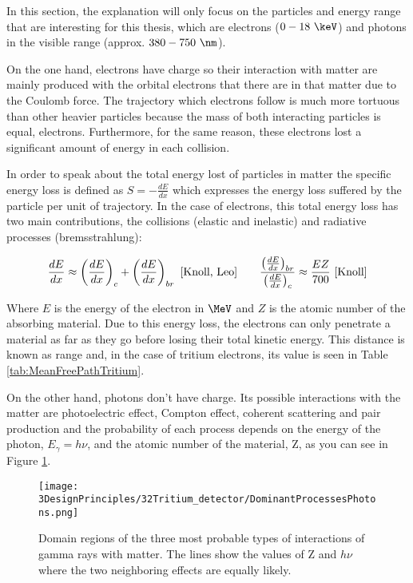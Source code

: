 In this section, the explanation will only focus on the particles and energy range that are interesting for this thesis, which are electrons ($0-18~\keV$) and photons in the visible range (approx. $380-750~\nm$).

On the one hand, electrons have charge so their interaction with matter are mainly produced with the orbital electrons that there are in that matter due to the Coulomb force. The trajectory which electrons follow is much more tortuous than other heavier particles because the mass of both interacting particles is equal, electrons. Furthermore, for the same reason, these electrons lost a significant amount of energy in each collision.

In order to speak about the total energy lost of particles in matter the specific energy loss is defined as $S=-\frac{dE}{dx}$ which expresses the energy loss suffered by the particle per unit of trajectory. In the case of electrons, this total energy loss has two main contributions, the collisions (elastic and inelastic) and radiative processes (bremsstrahlung):

\begin{equation}
\frac{dE}{dx} \approx \left(\frac{dE}{dx}\right)_{c} + \left(\frac{dE}{dx}\right)_{br} ~\cite{Knoll, Leo} \qquad  \frac{\left(\frac{dE}{dx}\right)_{br}}{\left(\frac{dE}{dx}\right)_{c}} \approx \frac{EZ}{700} ~\cite{Knoll}
\label{eq:ElectronInteraction}
\end{equation}

Where $E$ is the energy of the electron in $\MeV$ and $Z$ is the atomic number of the absorbing material. Due to this energy loss, the electrons can only penetrate a material as far as they go before losing their total kinetic energy. This distance is known as range and, in the case of tritium electrons, its value is seen in Table \ref{tab:MeanFreePathTritium}.

On the other hand, photons don't have charge. Its possible interactions with the matter are photoelectric effect, Compton effect, coherent scattering and pair production and the probability of each process depends on the energy of the photon, $E_\gamma = h\nu$, and the atomic number of the material, Z, as you can see in Figure \ref{fig:ProcessesPhotons}.

\begin{figure}[htbp]
\centering
\texttt{[image: 3DesignPrinciples/32Tritium\_detector/DominantProcessesPhotons.png]}
\caption{Domain regions of the three most probable types of interactions of gamma rays with matter. The lines show the values of Z and $h\nu$ where the two neighboring effects are equally likely.\label{fig:ProcessesPhotons}~\cite{Knoll, Leo}}
\end{figure}

